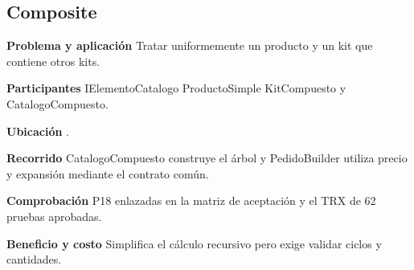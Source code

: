 \noindent\begin{minipage}{\linewidth}
\subsection{Composite}
\textbf{Problema y aplicación} Tratar uniformemente un producto y un kit que contiene otros kits.

\textbf{Participantes} IElementoCatalogo ProductoSimple KitCompuesto y CatalogoCompuesto.

\textbf{Ubicación} \href{https://github.com/Alan77-bot/LogiMarket360Alan/blob/68bda51063441415524ede51bdf61649ee9b4973/LogiMarket.Domain/Catalogo/KitCompuesto.cs#L18}{}.

\textbf{Recorrido} CatalogoCompuesto construye el árbol y PedidoBuilder utiliza precio y expansión mediante el contrato común.


\textbf{Comprobación} P18 enlazadas en la matriz de aceptación y el TRX de 62 pruebas aprobadas.

\textbf{Beneficio y costo} Simplifica el cálculo recursivo pero exige validar ciclos y cantidades.

\end{minipage}\par\smallskip
